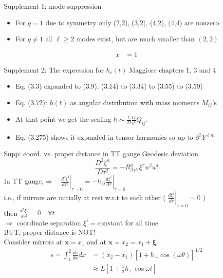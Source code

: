 \documentclass[xcolor=dvipsnames,handout,t]{beamer}
\renewcommand{\t}{\theta}
\begin{document}
\begin{frame}{Supplement 1: mode suppression}
\begin{itemize}
 \item For $q=1$ due to symmetry only (2,2), (3,2), (4,2), (4,4) are nonzero 
 \item For $q\ne 1$ all $\ell \ge 2$ modes exist, but are much smaller than $(2,2)$
\end{itemize}
\begin{align*}
      x &=1
      \end{align*}
\end{frame}

\begin{frame}{Supplement 2: The expression for $h_c(t)$}
Maggiore chapters 1, 3 and 4
\begin{itemize}
 \item Eq. (3.3) expanded to (3.9), (3.14) to (3.34) to (3.55) to (3.59)
 \item Eq. (3.72): $h(t)$ as angular distribution with mass moments $\ddot{M}_{ij}$'s
 \item At that point we get the scaling $h \sim \tfrac{1}{D}\tfrac{G}{c^4}\ddot{Q}_{ij}$.
 \item Eq. (3.275) shows it expanded in tensor harmonics so up to $\partial^2 Y^{\ell m}$
\end{itemize}
\end{frame}

\begin{frame}{Supp: coord. vs. proper distance in TT gauge}
  Geodesic deviation 
  \[
   \frac{D^2 \xi^\alpha}{D\tau^2} = -R^\alpha_{\beta \gamma\delta}\, \xi^\gamma u^\beta u^\delta 
  \]
In TT gauge,\qquad  $\Longrightarrow \quad\left.\tfrac{d^2 \xi^i}{d\tau^2}\right|_{\tau=0} = -\left. \dot{h}_{ij} \tfrac{d\xi^i}{d\tau}\right|_{\tau=0}$\\
i.e., if mirrors are initially at rest w.r.t to each other ( $\left. \tfrac{d\xi^i}{d\tau}\right|_{\tau=0} =0$ )\\
then $\tfrac{d^2 \xi^i}{d\tau^2}=0\quad \forall t$ \\
$\Longrightarrow$ coordinate separation $\xi^i = \text{constant}$ for all time \\
BUT, proper distance is NOT! \\
Consider mirrors at $\mathbf{x}=x_1$ and at $\mathbf{x}=x_2=x_1+\mathbf{\xi}$
\begin{align*}
  s = \int_1^2 \tfrac{ds}{dx}dx &= (x_2-x_1) \left[ 1 + h_+ \cos(\omega\t)\right]^{1/2} \\
			      & \approx L \left[ 1+\tfrac{1}{2} h_+ \cos\omega t \right] 
\end{align*}
 \end{frame}
\end{document}
